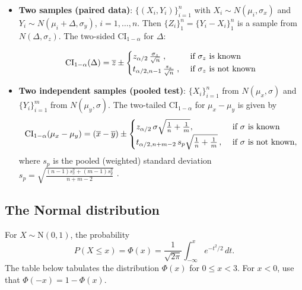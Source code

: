 \documentclass{article}
\newcommand{\Tr}[2]{#1}
\def\CI{\mbox{CI}}
\newcommand\conj[1]{{\overline #1}}
\let\ob\conj
\begin{document}
\begin{itemize}

\item \textbf{\Tr{Two samples (paired data)}{Två parade stickprov}}: %
  $\{(X_i,Y_i)\}_{i=1}^n$
  \Tr{with}{där}
   $X_i\Tr{\sim}{\sim} N(\mu_i,\sigma_x)$ \Tr{and}{och}
   $Y_i\Tr{\sim}{\sim} N(\mu_i+\Delta,\sigma_y)$, $i=1,\dots,n$.
   \Tr{Then}{Då} $\{Z_i\}_1^n=\{Y_i-X_i\}_1^n$
   \Tr{is a sample from}{är ett stickprov från}
   $N(\Delta,\sigma_z)$.
   \Tr{The two-sided $\CI_{1-\alpha}$ for}{Det tvåsidiga $\CI_{1-\alpha}$ för} $\Delta$:

\[
\CI_{1-\alpha}(\Delta)
   = \ob z
     \pm
   \begin{cases}
      \Tr{z}{\lambda}_{\alpha/2}\,\frac{\sigma_z}{\sqrt{n}}\;,
          & \text{ \Tr{if}{om} } \sigma_z \text{ \Tr{is known}{är känd}} \cr
      t_{\alpha/2,n-1}\,\frac{s_z}{\sqrt{n}}\;,
      & \text{ \Tr{if}{om} } \sigma_z \text{ \Tr{is not known}{är ej känd}}
    \end{cases}
  \]%

\item \textbf{\Tr{Two independent samples (pooled test)}{Två oberoende stickprov}}:
$\{X_i\}_{i=1}^{n}$ \Tr{from}{från} $N(\mu_x,\sigma)$
  \Tr{and}{och}
  $\{Y_i\}_{i=1}^{m}$ \Tr{from}{från} $N(\mu_y,\sigma)$.
  \Tr{The two-tailed $\CI_{1-\alpha}$ for $\mu_x-\mu_y$ is given by}
      {Det tvåsidiga $\CI_{1-\alpha}$ för $\mu_x-\mu_y$ ges av}
\[
  \CI_{1-\alpha}(\mu_x-\mu_y)
  = (\ob x-\ob y)
    \pm
   \begin{cases}
   \Tr{z}{\lambda}_{\alpha/2}\,\sigma\sqrt{\frac1n+\frac1m},
          & \text{ \Tr{if}{om} } \sigma \text{ \Tr{is known}{är känd}} \cr
          t_{\alpha/2,n+m-2}\,s_p\sqrt{\frac1n+\frac1m}\,,
      & \text{ \Tr{if}{om} } \sigma \text{ \Tr{is not known}{är ej känd}},
    \end{cases}
  \]
\Tr{where}{där}
$s_p$
\Tr{is the pooled (weighted) standard deviation}{är den vägda (pooled) standardavvikelsen}
\/$s_p =\sqrt{\frac{(n-1)s_x^2+(m-1)s_y^2}{n+m-2}}\,\cdot$

\end{itemize}

  \subsection*{\Tr{The Normal distribution}{Normalfördelningen}} %
  For $X\sim \text{N}(0,1)$, the probability
  \[
   P(X\le x) =  \Phi(x)=\frac1{\sqrt{2\pi}}\int_{-\infty}^xe^{-t^2/2}\,dt.
  \]
 The table below tabulates the distribution $\Phi(x)$ for $0\le x <3$.
 For $x<0$, use that $\Phi(-x)=1-\Phi(x)$.
\end{document}
